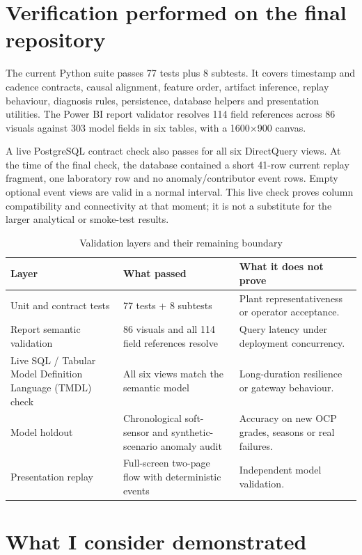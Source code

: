 \section{Verification performed on the final repository}

The current Python suite passes 77 tests plus 8 subtests. It covers timestamp and cadence contracts, causal alignment, feature order, artifact inference, replay behaviour, diagnosis rules, persistence, database helpers and presentation utilities. The Power BI report validator resolves 114 field references across 86 visuals against 303 model fields in six tables, with a 1600$\times$900 canvas.

A live PostgreSQL contract check also passes for all six DirectQuery views. At the time of the final check, the database contained a short 41-row current replay fragment, one laboratory row and no anomaly/contributor event rows. Empty optional event views are valid in a normal interval. This live check proves column compatibility and connectivity at that moment; it is not a substitute for the larger analytical or smoke-test results.

\begin{table}[htbp]
\centering\small
\caption{Validation layers and their remaining boundary}
\label{tab:validation-layers}
\begin{tabularx}{\textwidth}{@{}p{}p{}Y@{}}
\toprule
Layer & What passed & What it does not prove \\
\midrule
Unit and contract tests & 77 tests + 8 subtests & Plant representativeness or operator acceptance. \\
Report semantic validation & 86 visuals and all 114 field references resolve & Query latency under deployment concurrency. \\
Live SQL / Tabular Model Definition Language (TMDL) check & All six views match the semantic model & Long-duration resilience or gateway behaviour. \\
Model holdout & Chronological soft-sensor and synthetic-scenario anomaly audit & Accuracy on new OCP grades, seasons or real failures. \\
Presentation replay & Full-screen two-page flow with deterministic events & Independent model validation. \\
\bottomrule
\end{tabularx}
\end{table}

\section{What I consider demonstrated}

